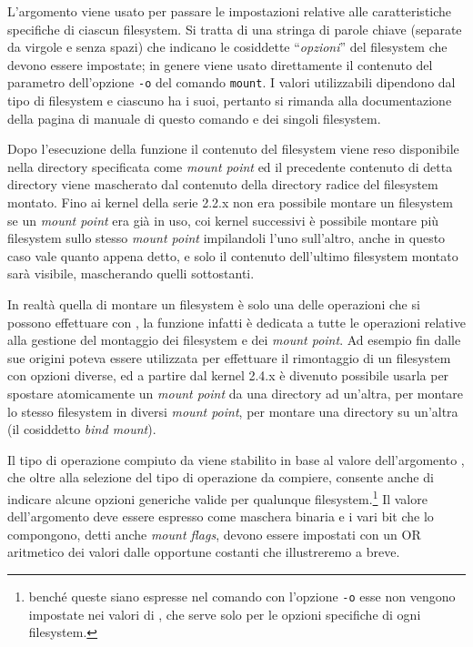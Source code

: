 L'argomento  viene usato per passare le impostazioni relative alle
caratteristiche specifiche di ciascun filesystem. Si tratta di una stringa di
parole chiave (separate da virgole e senza spazi) che indicano le cosiddette
``\textsl{opzioni}'' del filesystem che devono essere impostate; in genere
viene usato direttamente il contenuto del parametro dell'opzione \texttt{-o}
del comando \texttt{mount}. I valori utilizzabili dipendono dal tipo di
filesystem e ciascuno ha i suoi, pertanto si rimanda alla documentazione della
pagina di manuale di questo comando e dei singoli filesystem.

Dopo l'esecuzione della funzione il contenuto del filesystem viene reso
disponibile nella directory specificata come \textit{mount point} ed il
precedente contenuto di detta directory viene mascherato dal contenuto della
directory radice del filesystem montato. Fino ai kernel della serie 2.2.x non
era possibile montare un filesystem se un \textit{mount point} era già in uso,
coi kernel successivi è possibile montare più filesystem sullo stesso
\textit{mount point} impilandoli l'uno sull'altro, anche in questo caso vale
quanto appena detto, e solo il contenuto dell'ultimo filesystem montato sarà
visibile, mascherando quelli sottostanti.

In realtà quella di montare un filesystem è solo una delle operazioni che si
possono effettuare con , la funzione infatti è dedicata a tutte le
operazioni relative alla gestione del montaggio dei filesystem e dei
\textit{mount point}. Ad esempio fin dalle sue origini poteva essere
utilizzata per effettuare il rimontaggio di un filesystem con opzioni diverse,
ed a partire dal kernel 2.4.x è divenuto possibile usarla per spostare
atomicamente un \textit{mount point} da una directory ad un'altra, per montare
lo stesso filesystem in diversi \textit{mount point}, per montare una
directory su un'altra (il cosiddetto \textit{bind mount}).


Il tipo di operazione compiuto da  viene stabilito in base al
valore dell'argomento , che oltre alla selezione del tipo di
operazione da compiere, consente anche di indicare alcune opzioni generiche
valide per qualunque filesystem.\footnote{benché queste siano espresse nel
  comando  con l'opzione \texttt{-o} esse non vengono impostate nei
  valori di , che serve solo per le opzioni specifiche di ogni
  filesystem.}  Il valore dell'argomento deve essere espresso come maschera
binaria e i vari bit che lo compongono, detti anche \textit{mount flags},
devono essere impostati con un OR aritmetico dei valori dalle opportune
costanti che illustreremo a breve.

